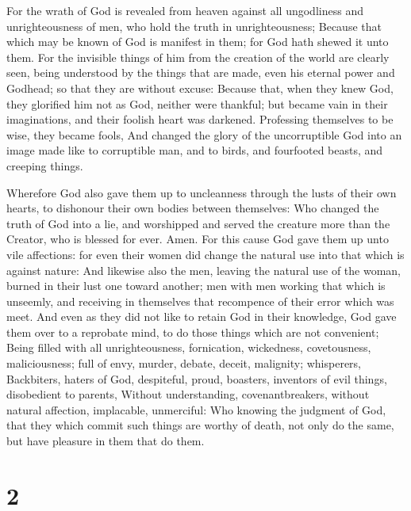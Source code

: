  For the wrath of God is revealed from heaven against all
ungodliness and unrighteousness of men, who hold the truth in
unrighteousness;  Because that which may be known of God
is manifest in them; for God hath shewed it unto them. 
For the invisible things of him from the creation of the world are
clearly seen, being understood by the things that are made, even his
eternal power and Godhead; so that they are without excuse:
 Because that, when they knew God, they glorified him not
as God, neither were thankful; but became vain in their imaginations,
and their foolish heart was darkened.  Professing
themselves to be wise, they became fools,  And changed
the glory of the uncorruptible God into an image made like to
corruptible man, and to birds, and fourfooted beasts, and creeping
things.

 Wherefore God also gave them up to uncleanness through
the lusts of their own hearts, to dishonour their own bodies between
themselves:  Who changed the truth of God into a lie, and
worshipped and served the creature more than the Creator, who is blessed
for ever. Amen.  For this cause God gave them up unto
vile affections: for even their women did change the natural use into
that which is against nature:  And likewise also the men,
leaving the natural use of the woman, burned in their lust one toward
another; men with men working that which is unseemly, and receiving in
themselves that recompence of their error which was meet.
 And even as they did not like to retain God in their
knowledge, God gave them over to a reprobate mind, to do those things
which are not convenient;  Being filled with all
unrighteousness, fornication, wickedness, covetousness, maliciousness;
full of envy, murder, debate, deceit, malignity; whisperers,
 Backbiters, haters of God, despiteful, proud, boasters,
inventors of evil things, disobedient to parents, 
Without understanding, covenantbreakers, without natural affection,
implacable, unmerciful:  Who knowing the judgment of God,
that they which commit such things are worthy of death, not only do the
same, but have pleasure in them that do them.

\hypertarget{section-1}{%
\section{2}\label{section-1}}

